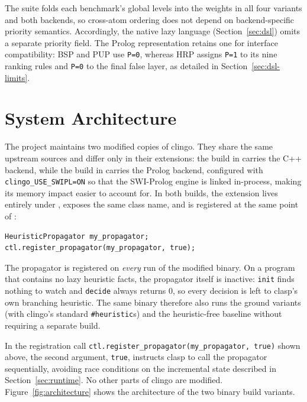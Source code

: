 The suite folds each benchmark's global levels into the weights in all four variants and both backends, so cross-atom ordering does not depend on backend-specific priority semantics. Accordingly, the native lazy language (Section~\ref{sec:dsl}) omits a separate priority field. The Prolog representation retains one for interface compatibility: BSP and PUP use \texttt{P=0}, whereas HRP assigns \texttt{P=1} to its nine ranking rules and \texttt{P=0} to the final false layer, as detailed in Section~\ref{sec:dsl-limits}.

\section{System Architecture}
\label{sec:architecture}

The project maintains two modified copies of clingo. They share the same upstream sources and differ only in their extensions: the build in  carries the C++ backend, while the build in  carries the Prolog backend, configured with \texttt{clingo\_USE\_SWIPL=ON} so that the SWI-Prolog engine is linked in-process, making its memory impact easier to account for. In both builds, the extension lives entirely under , exposes the same class name, and is registered at the same point of :

\begin{verbatim}
HeuristicPropagator my_propagator;
ctl.register_propagator(my_propagator, true);
\end{verbatim}

The propagator is registered on \emph{every} run of the modified binary. On a program that contains no lazy heuristic facts, the propagator itself is inactive: \texttt{init} finds nothing to watch and \texttt{decide} always returns $0$, so every decision is left to clasp's own branching heuristic. The same binary therefore also runs the ground variants (with clingo's standard \texttt{\#heuristic}s) and the heuristic-free baseline without requiring a separate build. 

In the registration call \texttt{ctl.register\_propagator(my\_propagator, true)} shown above, the second argument, \texttt{true}, instructs clasp to call the propagator sequentially, avoiding race conditions on the incremental state described in Section~\ref{sec:runtime}. No other parts of clingo are modified. Figure~\ref{fig:architecture} shows the architecture of the two binary build variants.

